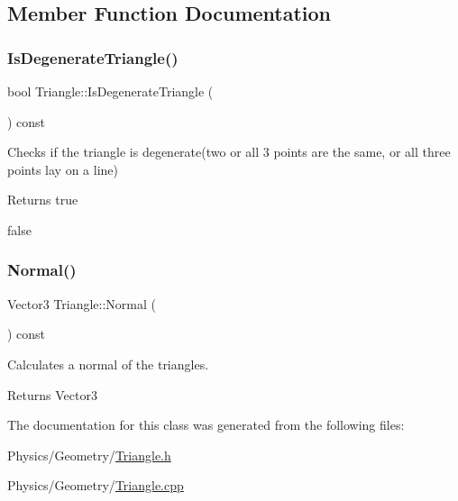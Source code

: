\subsection{Member Function Documentation}
\mbox{\label{classTriangle_a475f07ea83d763614570c820dd10230b}} 
\subsubsection{\texorpdfstring{Is\+Degenerate\+Triangle()}{IsDegenerateTriangle()}}
{\footnotesize\ttfamily bool Triangle\+::\+Is\+Degenerate\+Triangle (\begin{DoxyParamCaption}{ }\end{DoxyParamCaption}) const}



Checks if the triangle is degenerate(two or all 3 points are the same, or all three points lay on a line) 

\begin{DoxyReturn}{Returns}
true 

false 
\end{DoxyReturn}
\mbox{\label{classTriangle_afa65f5d26672ed568b4266a66a372c3a}} 
\subsubsection{\texorpdfstring{Normal()}{Normal()}}
{\footnotesize\ttfamily Vector3 Triangle\+::\+Normal (\begin{DoxyParamCaption}{ }\end{DoxyParamCaption}) const}



Calculates a normal of the triangles. 

\begin{DoxyReturn}{Returns}
Vector3 
\end{DoxyReturn}


The documentation for this class was generated from the following files\+:\begin{DoxyCompactItemize}
\item 
Physics/\+Geometry/\hyperlink{Triangle_8h}{Triangle.\+h}\item 
Physics/\+Geometry/\hyperlink{Triangle_8cpp}{Triangle.\+cpp}\end{DoxyCompactItemize}
